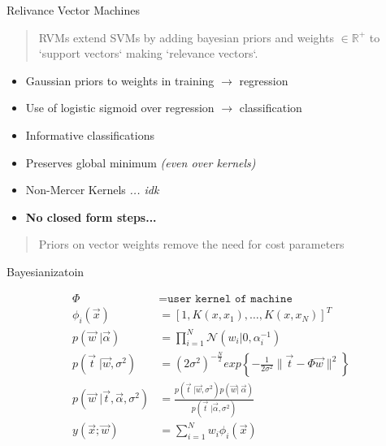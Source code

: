 \documentclass[10pt]{beamer}
\begin{document}
\begin{frame}{Relivance Vector Machines}

  \begin{quote}
    RVMs extend SVMs by adding bayesian priors and weights \(\in \mathbb{R}^+\) to
    `support vectors` making `relevance vectors`.
  \end{quote}

  \begin{itemize}
  \item Gaussian priors to weights in training \;$\rightarrow$ regression
  \item Use of logistic sigmoid over regression $\rightarrow$ classification
  \item Informative classifications
  \item Preserves global minimum {\em (even over kernels)}
  \item Non-Mercer Kernels {\em ... idk}
  \item {\bf No closed form steps...}
  \end{itemize}

  \begin{quote}
    Priors on vector weights remove the need for cost parameters
  \end{quote}
\end{frame}

\begin{frame}{Bayesianizatoin}

  \begin{align*}
    \Phi &= \texttt{user kernel of machine} \\
    \phi_i(\vec{x}) &= \left[1, K(x, x_1), \ldots, K(x, x_N)\right]^T \\
    p(\vec{w}\;| \vec{\alpha}) &= \prod_{i=1}^N \mathcal{N}(w_i| 0, \alpha_i^{-1}) \\
    p(\vec{t}\;|\vec{w}, \sigma^2) &= (2\sigma^2)^{-\frac{N}{2}} exp\left\{- \frac{1}{2\sigma^2}\|\vec{t} - \Phi\vec{w}\|^2 \right\}\\
    p(\vec{w}\;|\vec{t}, \vec{\alpha}, \sigma^2) &= \frac{p(\vec{t}\;|\vec{w}, \sigma^2)p(\vec{w}|\;\vec{\alpha})}{p(\vec{t}\;|\vec{\alpha}, \sigma^2)} \\
    y(\vec{x}; \vec{w}) &= \sum_{i=1}^N w_i \phi_i(\vec{x}) \\
  \end{align*}

\end{frame}
\end{document}
